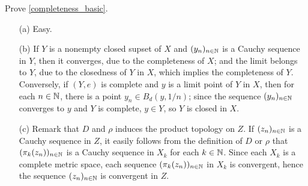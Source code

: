 \begin{prob}\label{completeness_basic_sol}
    Prove \cref{completeness_basic}.
\end{prob}
\begin{sol}
    \begin{enumerate}
        \item[(a)]
        {
            Easy.
        }
        \item[(b)]
        {
            If $Y$ is a nonempty closed supset of $X$ and $(y_n)_{n\in{\mathbb{N}}}$ is a Cauchy sequence in $Y$, then it converges, due to the completeness of $X$; and the limit belongs to $Y$, due to the closedness of $Y$ in $X$, which implies the completeness of $Y$.
            Conversely, if $(Y, e)$ is complete and $y$ is a limit point of $Y$ in $X$, then for each $n\in{\mathbb{N}}$, there is a point $y_n\in B_d(y, 1/n)$; since the sequence $(y_n)_{n\in{\mathbb{N}}}$ converges to $y$ and $Y$ is complete, $y\in Y$, so $Y$ is closed in $X$.
        }
        \item[(c)]
        {
            Remark that $D$ and $\rho$ induces the product topology on $Z$.
            If $(z_n)_{n\in{\mathbb{N}}}$ is a Cauchy sequence in $Z$, it easily follows from the definition of $D$ or $\rho$ that $(\pi_k(z_n))_{n\in{\mathbb{N}}}$ is a Cauchy sequence in $X_k$ for each $k\in{\mathbb{N}}$.
            Since each $X_k$ is a complete metric space, each sequence $(\pi_k(z_n))_{n\in{\mathbb{N}}}$ in $X_k$ is convergent, hence the sequence $(z_n)_{n\in{\mathbb{N}}}$ is convergent in $Z$.
        }
    \end{enumerate}
\end{sol}